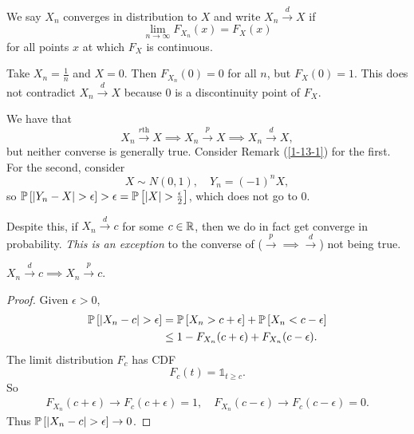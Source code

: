 \begin{definition}
	We say $X_n$ converges in distribution to $X$ and write $X_n\xrightarrow{d}X$ if
	\[
		\lim_{n\to\infty}F_{X_n}(x)=F_X(x)
	\]
	for all points $x$ at which $F_X$ is continuous.
\end{definition}

\begin{remark}	Take $X_n=\frac{1}{n}$ and $X=0$. Then $F_{X_n}(0)=0$ for all $n$, but $F_X(0)=1$. This does not contradict $X_n\xrightarrow{d}X$ because $0$ is a discontinuity point of $F_X$.
\end{remark}

\begin{remark}	We have that \[
		X_n \xrightarrow{r\text{th}} X \implies X_n \xrightarrow{p} X \implies X_n \xrightarrow{d} X
		,\] but neither converse is generally true. Consider Remark (\ref{1-13-1}) for the first. For the second, consider \[
		X \sim N(0,1), \quad Y_n = (-1)^n X
		,\] so $\P\left[\left| Y_n - X \right| > \epsilon\right] > \epsilon = \P\left[\left| X \right| > \frac{\epsilon}{2}\right] $, which does not go to $0$.
\end{remark}

Despite this, if $X_n \xrightarrow{d} c$ for some $c \in \R$, then we do in fact get converge in probability. \emph{This is an exception} to the converse of ($\xrightarrow{p} \implies \xrightarrow{d}$) not being true.

\begin{proposition}	$X_n \xrightarrow{d} c \implies X_n \xrightarrow{p} c$.
\end{proposition}
\begin{proof}
	Given $\epsilon > 0$,
	\begin{align*}
		\P\left[\left| X_n - c \right| > \epsilon\right] & = \P\left[X_n > c + \epsilon\right] + \P\left[X_n < c-\epsilon\right] \\
		                                                 & \le 1 - F_{X_n}(c+ \epsilon) + F_{X_n}(c-\epsilon)
		.\end{align*}
	The limit distribution $F_c$ has CDF \[
		F_c(t) = \mathds{1}_{t \ge c}
		.\] So
	\begin{align*}
		F_{X_n}(c + \epsilon) \to F_c(c + \epsilon) = 1, \quad F_{X_n}(c-\epsilon) \to F_c(c-\epsilon) = 0
		.\end{align*}
	Thus $\P\left[\left| X_n - c \right| > \epsilon\right] \to 0$.
\end{proof}

